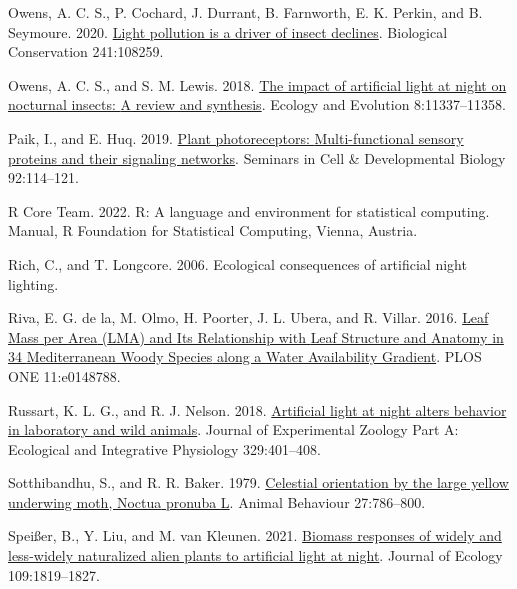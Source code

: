 \documentclass[
  12pt,
  letterpaper,
  DIV=11,
  numbers=noendperiod]{scrartcl}
\newlength{\cslhangindent}
\newlength{\cslentryspacingunit} %
\newenvironment{CSLReferences}[2] %
 {%
  \setlength{\parindent}{0pt}
  \ifodd #1
  \let\oldpar\par
  \def\par{\hangindent=\cslhangindent\oldpar}
  \fi
  \setlength{\parskip}{#2\cslentryspacingunit}
 }%
 {}
\begin{document}
\begin{CSLReferences}{1}{0}
\leavevmode{}%
Owens, A. C. S., P. Cochard, J. Durrant, B. Farnworth, E. K. Perkin, and
B. Seymoure. 2020.
\href{https://doi.org/10.1016/j.biocon.2019.108259}{Light pollution is a
driver of insect declines}. Biological Conservation 241:108259.

\leavevmode{}%
Owens, A. C. S., and S. M. Lewis. 2018.
\href{https://doi.org/10.1002/ece3.4557}{The impact of artificial light
at night on nocturnal insects: {A} review and synthesis}. Ecology and
Evolution 8:11337--11358.

\leavevmode{}%
Paik, I., and E. Huq. 2019.
\href{https://doi.org/10.1016/j.semcdb.2019.03.007}{Plant
photoreceptors: {Multi-functional} sensory proteins and their signaling
networks}. Seminars in Cell \& Developmental Biology 92:114--121.

\leavevmode{}%
R Core Team. 2022. R: {A} language and environment for statistical
computing. Manual, {R Foundation for Statistical Computing}, {Vienna,
Austria}.

\leavevmode{}%
Rich, C., and T. Longcore. 2006. Ecological consequences of artificial
night lighting.

\leavevmode{}%
Riva, E. G. de la, M. Olmo, H. Poorter, J. L. Ubera, and R. Villar.
2016. \href{https://doi.org/10.1371/journal.pone.0148788}{Leaf {Mass}
per {Area} ({LMA}) and {Its Relationship} with {Leaf Structure} and
{Anatomy} in 34 {Mediterranean Woody Species} along a {Water
Availability Gradient}}. PLOS ONE 11:e0148788.

\leavevmode{}%
Russart, K. L. G., and R. J. Nelson. 2018.
\href{https://doi.org/10.1002/jez.2173}{Artificial light at night alters
behavior in laboratory and wild animals}. Journal of Experimental
Zoology Part A: Ecological and Integrative Physiology 329:401--408.

\leavevmode{}%
Sotthibandhu, S., and R. R. Baker. 1979.
\href{https://doi.org/10.1016/0003-3472(79)90015-0}{Celestial
orientation by the large yellow underwing moth, {Noctua} pronuba {L}}.
Animal Behaviour 27:786--800.

\leavevmode{}%
Speißer, B., Y. Liu, and M. van Kleunen. 2021.
\href{https://doi.org/10.1111/1365-2745.13607}{Biomass responses of
widely and less-widely naturalized alien plants to artificial light at
night}. Journal of Ecology 109:1819--1827.


\end{CSLReferences}
\end{document}
